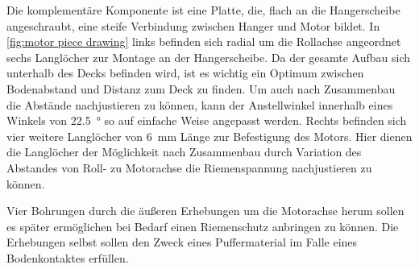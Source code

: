 		Die komplementäre Komponente ist eine Platte, die, flach an die Hangerscheibe angeschraubt, eine steife Verbindung zwischen Hanger und Motor bildet.
		In \cref{fig:motor piece drawing} links befinden sich radial um die Rollachse angeordnet sechs Langlöcher zur Montage an der Hangerscheibe.
		Da der gesamte Aufbau sich unterhalb des Decks befinden wird, ist es wichtig ein Optimum zwischen Bodenabstand und Distanz zum Deck zu finden.
		Um auch nach Zusammenbau die Abstände nachjustieren zu können, kann der Anstellwinkel innerhalb eines Winkels von \qty{22,5}{\degree} so auf einfache Weise angepasst werden.
		Rechts befinden sich vier weitere Langlöcher von \qty{6}{\milli\metre} Länge zur Befestigung des Motors.
		Hier dienen die Langlöcher der Möglichkeit nach Zusammenbau durch Variation des Abstandes von Roll- zu Motorachse die Riemenspannung nachjustieren zu können.\par
		Vier Bohrungen durch die äußeren Erhebungen um die Motorachse herum sollen es später ermöglichen bei Bedarf einen Riemenschutz anbringen zu können.
		Die Erhebungen selbst sollen den Zweck eines Puffermaterial im Falle eines Bodenkontaktes erfüllen.
